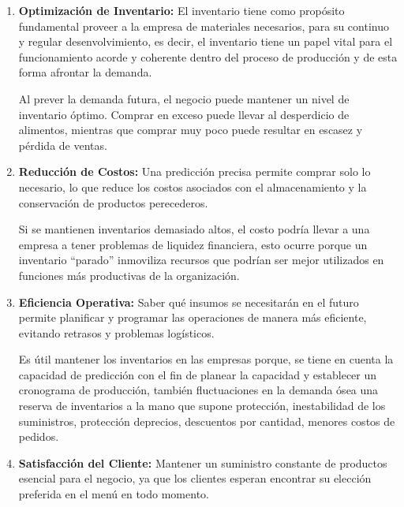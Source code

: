 \begin{enumerate}
  \item \textbf{Optimización de Inventario:} El inventario tiene como propósito fundamental proveer a la empresa de materiales necesarios, para  su  continuo  y  regular  desenvolvimiento,  es  decir,  el  inventario  tiene  un  papel  vital  para  el funcionamiento acorde y coherente dentro del proceso de producción y de esta forma afrontar la demanda\cite{marques2017nivel}.
  
  Al prever la demanda futura, el negocio puede mantener un nivel de inventario óptimo. Comprar en exceso puede llevar al desperdicio de alimentos, mientras que comprar muy poco puede resultar en escasez y pérdida de ventas.
  
  \item \textbf{Reducción de Costos:} Una predicción precisa permite comprar solo lo necesario, lo que reduce los costos asociados con el almacenamiento y la conservación de productos perecederos.
  
  Si  se  mantienen inventarios  demasiado  altos,  el  costo  podría  llevar  a  una  empresa  a  tener  problemas  de  liquidez financiera, esto ocurre porque un inventario “parado” inmoviliza recursos que podrían ser mejor utilizados en funciones más productivas de la organización\cite{marques2017nivel}.
  

  \item \textbf{Eficiencia Operativa:} Saber qué insumos se necesitarán en el futuro permite planificar y programar las operaciones de manera más eficiente, evitando retrasos y problemas logísticos.
  
  Es  útil  mantener  los  inventarios  en  las  empresas porque,  se  tiene  en  cuenta  la  capacidad  de  predicción  con  el  fin  de  planear  la  capacidad  y establecer un cronograma de producción, también fluctuaciones en la demanda ósea una reserva de  inventarios  a  la  mano  que  supone  protección,  inestabilidad  de  los  suministros,  protección  deprecios, descuentos por cantidad, menores costos de pedidos\cite{marques2017nivel}.

  
  
  \item \textbf{Satisfacción del Cliente:} Mantener un suministro constante de productos esencial para el negocio, ya que los clientes esperan encontrar su elección preferida en el menú en todo momento.
\end{enumerate}

